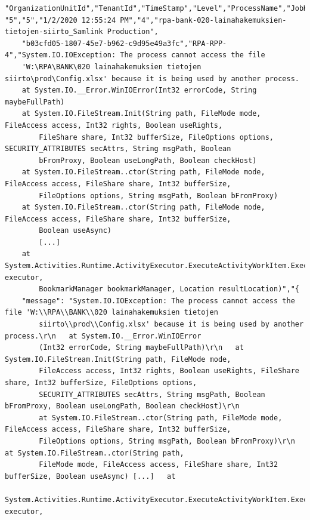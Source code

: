 \begin{Verbatim}[fontsize=\tiny]
"OrganizationUnitId","TenantId","TimeStamp","Level","ProcessName","JobKey","RobotName","Message","RawMessage","MachineId"
"5","5","1/2/2020 12:55:24 PM","4","rpa-bank-020-lainahakemuksien-tietojen-siirto_Samlink Production",
    "b03cfd05-1807-45e7-b962-c9d95e49a3fc","RPA-RPP-4","System.IO.IOException: The process cannot access the file
    'W:\RPA\BANK\020 lainahakemuksien tietojen siirto\prod\Config.xlsx' because it is being used by another process.
    at System.IO.__Error.WinIOError(Int32 errorCode, String maybeFullPath)
    at System.IO.FileStream.Init(String path, FileMode mode, FileAccess access, Int32 rights, Boolean useRights,
        FileShare share, Int32 bufferSize, FileOptions options, SECURITY_ATTRIBUTES secAttrs, String msgPath, Boolean
        bFromProxy, Boolean useLongPath, Boolean checkHost)
    at System.IO.FileStream..ctor(String path, FileMode mode, FileAccess access, FileShare share, Int32 bufferSize,
        FileOptions options, String msgPath, Boolean bFromProxy)
    at System.IO.FileStream..ctor(String path, FileMode mode, FileAccess access, FileShare share, Int32 bufferSize,
        Boolean useAsync)
        [...]
    at System.Activities.Runtime.ActivityExecutor.ExecuteActivityWorkItem.ExecuteBody(ActivityExecutor executor,
        BookmarkManager bookmarkManager, Location resultLocation)","{
    "message": "System.IO.IOException: The process cannot access the file 'W:\\RPA\\BANK\\020 lainahakemuksien tietojen
        siirto\\prod\\Config.xlsx' because it is being used by another process.\r\n   at System.IO.__Error.WinIOError
        (Int32 errorCode, String maybeFullPath)\r\n   at System.IO.FileStream.Init(String path, FileMode mode,
        FileAccess access, Int32 rights, Boolean useRights, FileShare share, Int32 bufferSize, FileOptions options,
        SECURITY_ATTRIBUTES secAttrs, String msgPath, Boolean bFromProxy, Boolean useLongPath, Boolean checkHost)\r\n
        at System.IO.FileStream..ctor(String path, FileMode mode, FileAccess access, FileShare share, Int32 bufferSize,
        FileOptions options, String msgPath, Boolean bFromProxy)\r\n   at System.IO.FileStream..ctor(String path,
        FileMode mode, FileAccess access, FileShare share, Int32 bufferSize, Boolean useAsync) [...]   at
        System.Activities.Runtime.ActivityExecutor.ExecuteActivityWorkItem.ExecuteBody(ActivityExecutor executor,

\end{Verbatim}

